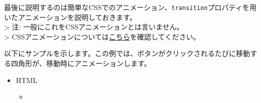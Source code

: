 最後に説明するのは簡単なCSSでのアニメーション、\texttt{transition}プロパティを用いたアニメーションを説明しておきます。\\
\textgreater{} 注: 一般にこれをCSSアニメーションとは言いません。\\
\textgreater{}
CSSアニメーションについては\href{https://developer.mozilla.org/ja/docs/Web/CSS/CSS_animations/Using_CSS_animations}{こちら}を確認してください。

以下にサンプルを示します。この例では、ボタンがクリックされるたびに移動する四角形が、移動時にアニメーションします。

\begin{itemize}
\item
  HTML

  \begin{itemize}
  \item
\begin{Shaded}
\begin{Highlighting}[]
    \DataTypeTok{\textgreater{}}
    \DataTypeTok{\textless{}}\OperatorTok{=}\DataTypeTok{\textgreater{}}
      \DataTypeTok{\textless{}}\DataTypeTok{\textgreater{}}
        \DataTypeTok{\textless{}}\OperatorTok{=}\OtherTok{ }\DataTypeTok{/\textgreater{}}
        \DataTypeTok{\textless{}}\OperatorTok{=}\OperatorTok{=}\OtherTok{ }\DataTypeTok{/\textgreater{}}
        \DataTypeTok{\textless{}}\DataTypeTok{\textgreater{}}\DataTypeTok{\textless{}/}\DataTypeTok{\textgreater{}}
        \DataTypeTok{\textless{}}\OperatorTok{=}\DataTypeTok{\textgreater{}\textless{}/}\DataTypeTok{\textgreater{}}
        \DataTypeTok{\textless{}}\OperatorTok{=}\OperatorTok{=}\DataTypeTok{/\textgreater{}}
      \DataTypeTok{\textless{}/}\DataTypeTok{\textgreater{}}
      \DataTypeTok{\textless{}}\DataTypeTok{\textgreater{}}
        \DataTypeTok{\textless{}}\OperatorTok{=}\DataTypeTok{\textgreater{}}\DataTypeTok{\textless{}/}\DataTypeTok{\textgreater{}}

\end{Highlighting}
\end{Shaded}
\end{itemize}
\end{itemize}

